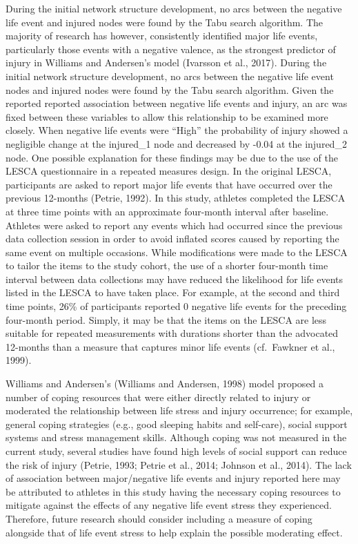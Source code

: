 \documentclass[
  english,
  man,floatsintext]{apa6}
\begin{document}
During the initial network structure development, no arcs between the negative life event and injured nodes were found by the Tabu search algorithm. The majority of research has however, consistently identified major life events, particularly those events with a negative valence, as the strongest predictor of injury in Williams and Andersen's model (Ivarsson et al., 2017).
During the initial network structure development, no arcs between the negative life event nodes and injured nodes were found by the Tabu search algorithm.
Given the reported reported association between negative life events and injury, an arc was fixed between these variables to allow this relationship to be examined more closely.
When negative life events were ``High'' the probability of injury showed a negligible change at the injured\_1 node and decreased by -0.04 at the injured\_2 node.
One possible explanation for these findings may be due to the use of the LESCA questionnaire in a repeated measures design.
In the original LESCA, participants are asked to report major life events that have occurred over the previous 12-months (Petrie, 1992).
In this study, athletes completed the LESCA at three time points with an approximate four-month interval after baseline. Athletes were asked to report any events which had occurred since the previous data collection session in order to avoid inflated scores caused by reporting the same event on multiple occasions.
While modifications were made to the LESCA to tailor the items to the study cohort, the use of a shorter four-month time interval between data collections may have reduced the likelihood for life events listed in the LESCA to have taken place. For example, at the second and third time points, 26\% of participants reported 0 negative life events for the preceding four-month period. Simply, it may be that the items on the LESCA are less suitable for repeated measurements with durations shorter than the advocated 12-months than a measure that captures minor life events (cf.~Fawkner et al., 1999).

Williams and Andersen's (Williams and Andersen, 1998) model proposed a number of coping resources that were either directly related to injury or moderated the relationship between life stress and injury occurrence; for example, general coping strategies (e.g., good sleeping habits and self-care), social support systems and stress management skills.
Although coping was not measured in the current study, several studies have found high levels of social support can reduce the risk of injury (Petrie, 1993; Petrie et al., 2014; Johnson et al., 2014).
The lack of association between major/negative life events and injury reported here may be attributed to athletes in this study having the necessary coping resources to mitigate against the effects of any negative life event stress they experienced.
Therefore, future research should consider including a measure of coping alongside that of life event stress to help explain the possible moderating effect.
\end{document}
